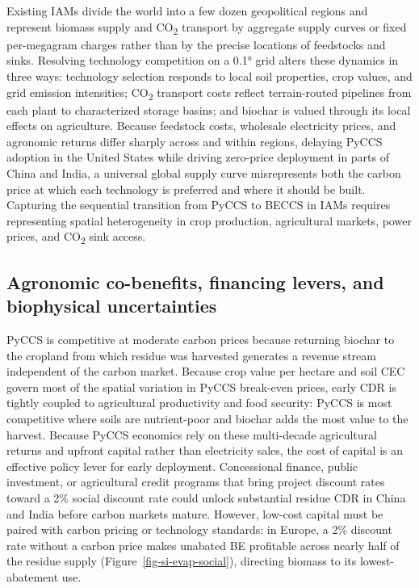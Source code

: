 \documentclass[
  letterpaper,
  twoside,
  twocolumn,
  9pt]{article}
\begin{document}
Existing IAMs divide the world into a few dozen geopolitical regions and
represent biomass supply and CO\textsubscript{2} transport by aggregate
supply curves or fixed per-megagram charges rather than by the precise
locations of feedstocks and sinks.\citep{gambhir2019} Resolving
technology competition on a 0.1° grid alters these dynamics in three
ways: technology selection responds to local soil properties, crop
values, and grid emission intensities; CO\textsubscript{2} transport
costs reflect terrain-routed pipelines from each plant to characterized
storage basins; and biochar is valued through its local effects on
agriculture. Because feedstock costs, wholesale electricity prices, and
agronomic returns differ sharply across and within regions, delaying
PyCCS adoption in the United States while driving zero-price deployment
in parts of China and India, a universal global supply curve
misrepresents both the carbon price at which each technology is
preferred and where it should be built. Capturing the sequential
transition from PyCCS to BECCS in IAMs requires representing spatial
heterogeneity in crop production, agricultural markets, power prices,
and CO\textsubscript{2} sink access.

\subsection{Agronomic co-benefits, financing levers, and biophysical
uncertainties}\label{agronomic-co-benefits-financing-levers-and-biophysical-uncertainties}

PyCCS is competitive at moderate carbon prices because returning biochar
to the cropland from which residue was harvested generates a revenue
stream independent of the carbon market. Because crop value per hectare
and soil CEC govern most of the spatial variation in PyCCS break-even
prices, early CDR is tightly coupled to agricultural productivity and
food security: PyCCS is most competitive where soils are nutrient-poor
and biochar adds the most value to the harvest. Because PyCCS economics
rely on these multi-decade agricultural returns and upfront capital
rather than electricity sales, the cost of capital is an effective
policy lever for early deployment. Concessional finance, public
investment, or agricultural credit programs that bring project discount
rates toward a 2\% social discount rate could unlock substantial residue
CDR in China and India before carbon markets mature. However, low-cost
capital must be paired with carbon pricing or technology standards: in
Europe, a 2\% discount rate without a carbon price makes unabated BE
profitable across nearly half of the residue supply
(Figure~\ref{fig-si-evap-social}), directing biomass to its
lowest-abatement use.
\end{document}
